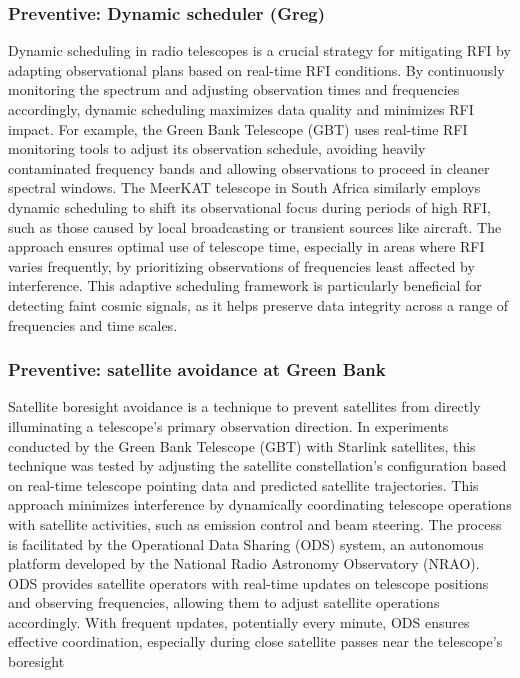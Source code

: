 \subsubsection{Preventive: Dynamic scheduler (Greg)}
Dynamic scheduling in radio telescopes is a crucial strategy for mitigating RFI by adapting observational plans based on real-time RFI conditions. By continuously monitoring the spectrum and adjusting observation times and frequencies accordingly, dynamic scheduling maximizes data quality and minimizes RFI impact. For example, the Green Bank Telescope (GBT) uses real-time RFI monitoring tools to adjust its observation schedule, avoiding heavily contaminated frequency bands and allowing observations to proceed in cleaner spectral windows. The MeerKAT telescope in South Africa similarly employs dynamic scheduling to shift its observational focus during periods of high RFI, such as those caused by local broadcasting or transient sources like aircraft. The approach ensures optimal use of telescope time, especially in areas where RFI varies frequently, by prioritizing observations of frequencies least affected by interference. This adaptive scheduling framework is particularly beneficial for detecting faint cosmic signals, as it helps preserve data integrity across a range of frequencies and time scales.

\subsubsection{Preventive: satellite avoidance at Green Bank}
Satellite boresight avoidance is a technique to prevent satellites from directly illuminating a telescope's primary observation direction. In experiments conducted by the Green Bank Telescope (GBT) with Starlink satellites, this technique was tested \cite{nhan2024spectrumcoexistencedemonstrationeffectiveness} by adjusting the satellite constellation's configuration based on real-time telescope pointing data and predicted satellite trajectories. This approach minimizes interference by dynamically coordinating telescope operations with satellite activities, such as emission control and beam steering. The process is facilitated by the Operational Data Sharing (ODS) system, an autonomous platform developed by the National Radio Astronomy Observatory (NRAO). ODS provides satellite operators with real-time updates on telescope positions and observing frequencies, allowing them to adjust satellite operations accordingly. With frequent updates, potentially every minute, ODS ensures effective coordination, especially during close satellite passes near the telescope’s boresight

